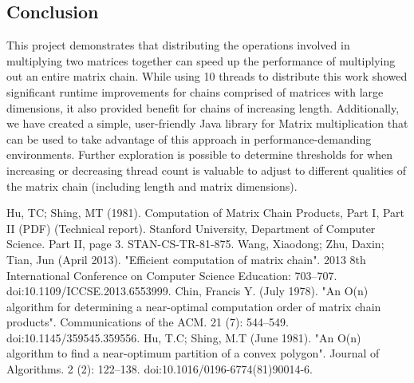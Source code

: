 \documentclass[conference,leqno]{IEEEtran}
\begin{document}
\subsection{Conclusion}
This project demonstrates that distributing the operations involved in multiplying two matrices together can speed up the performance of multiplying out an entire matrix chain. While using 10 threads to distribute this work showed significant runtime improvements for chains comprised of matrices with large dimensions, it also provided benefit for chains of increasing length. Additionally, we have created a simple, user-friendly Java library for Matrix multiplication that can be used to take advantage of this approach in performance-demanding environments. Further exploration is possible to determine thresholds for when increasing or decreasing thread count is valuable to adjust to different qualities of the matrix chain (including length and matrix dimensions).

\begin{thebibliography}{00}
 Hu, TC; Shing, MT (1981). Computation of Matrix Chain Products, Part I, Part II (PDF) (Technical report). Stanford University, Department of Computer Science. Part II, page 3. STAN-CS-TR-81-875.
 Wang, Xiaodong; Zhu, Daxin; Tian, Jun (April 2013). "Efficient computation of matrix chain". 2013 8th International Conference on Computer Science Education: 703–707. doi:10.1109/ICCSE.2013.6553999.
 Chin, Francis Y. (July 1978). "An O(n) algorithm for determining a near-optimal computation order of matrix chain products". Communications of the ACM. 21 (7): 544–549. doi:10.1145/359545.359556.
 Hu, T.C; Shing, M.T (June 1981). "An O(n) algorithm to find a near-optimum partition of a convex polygon". Journal of Algorithms. 2 (2): 122–138. doi:10.1016/0196-6774(81)90014-6.
\end{thebibliography}
\end{document}
